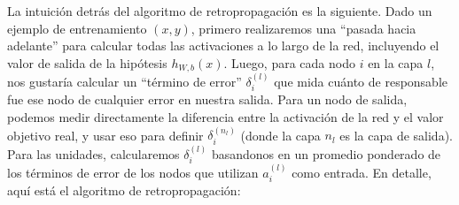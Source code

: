 La intuición detrás del algoritmo de retropropagación es la siguiente. Dado un ejemplo de entrenamiento $(x, y)$, primero realizaremos una ``pasada hacia adelante'' para calcular todas las activaciones a lo largo de la red, incluyendo el valor de salida de la hipótesis $h_{W,b}(x)$. Luego, para cada nodo $i$ en la capa $l$, nos gustaría calcular un ``término de error'' $\delta^{(l)}_i$ que mida cuánto de responsable fue ese nodo de cualquier error en nuestra salida. Para un nodo de salida, podemos medir directamente la diferencia entre la activación de la red y el valor objetivo real, y usar eso para definir $\delta^{(n_l)}_i$ (donde la capa $n_l$ es la capa de salida). Para las unidades, calcularemos $\delta^{(l)}_i$ basandonos en un promedio ponderado de los términos de error de los nodos que utilizan $a^{(l)}_i$ como entrada. En detalle, aquí está el algoritmo de retropropagación:

